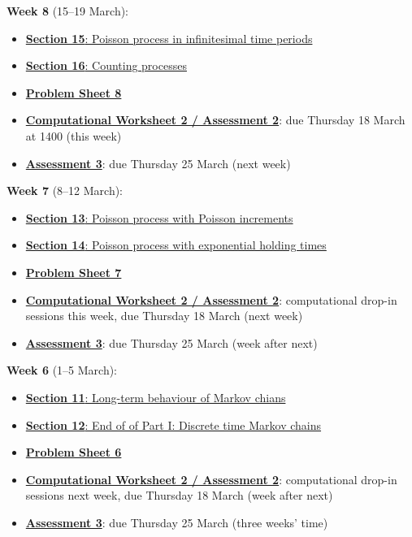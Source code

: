 \documentclass[
  a4paper,
]{article}
\providecommand{\tightlist}{%
  \setlength{\itemsep}{0pt}\setlength{\parskip}{0pt}}
\theoremstyle{definition}
\theoremstyle{definition}
\theoremstyle{definition}
\theoremstyle{remark}
\begin{document}
\textbf{Week 8} (15--19 March):

\begin{itemize}
\tightlist
\item
  \protect\hyperlink{S15-poisson-infinitesimal}{\textbf{Section 15}: Poisson process in infinitesimal time periods}
\item
  \protect\hyperlink{S16-counting-processes}{\textbf{Section 16}: Counting processes}
\item
  \protect\hyperlink{P08}{\textbf{Problem Sheet 8}}
\item
  \protect\hyperlink{computing}{\textbf{Computational Worksheet 2 / Assessment 2}}: due Thursday 18 March at 1400 (this week)
\item
  \protect\hyperlink{A3}{\textbf{Assessment 3}}: due Thursday 25 March (next week)
\end{itemize}

\textbf{Week 7} (8--12 March):

\begin{itemize}
\tightlist
\item
  \protect\hyperlink{S13-poisson-poisson}{\textbf{Section 13}: Poisson process with Poisson increments}
\item
  \protect\hyperlink{S14-poisson-exponential}{\textbf{Section 14}: Poisson process with exponential holding times}
\item
  \protect\hyperlink{P07}{\textbf{Problem Sheet 7}}
\item
  \protect\hyperlink{computing}{\textbf{Computational Worksheet 2 / Assessment 2}}: computational drop-in sessions this week, due Thursday 18 March (next week)
\item
  \protect\hyperlink{A3}{\textbf{Assessment 3}}: due Thursday 25 March (week after next)
\end{itemize}

\textbf{Week 6} (1--5 March):

\begin{itemize}
\tightlist
\item
  \protect\hyperlink{S11-long-term-chains}{\textbf{Section 11}: Long-term behaviour of Markov chians}
\item
  \protect\hyperlink{S12-revision-i}{\textbf{Section 12}: End of of Part I: Discrete time Markov chains}
\item
  \protect\hyperlink{P06}{\textbf{Problem Sheet 6}}
\item
  \protect\hyperlink{computing}{\textbf{Computational Worksheet 2 / Assessment 2}}: computational drop-in sessions next week, due Thursday 18 March (week after next)
\item
  \protect\hyperlink{A3}{\textbf{Assessment 3}}: due Thursday 25 March (three weeks' time)
\end{itemize}
\end{document}
